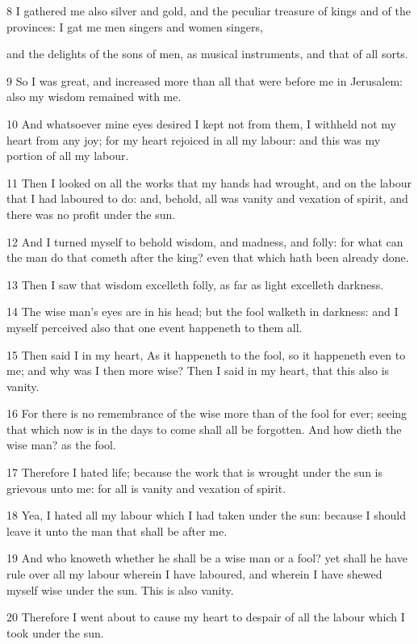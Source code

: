 \documentclass[12pt]{report}
\begin{document}
8 I gathered me also silver and gold, and the peculiar treasure
   of
   kings and of the provinces: I gat me men singers and women singers,
   
   and the delights of the sons of men, as musical instruments, and
   that
   of all sorts. 
   
9 So I was great, and increased more than all that were before me
   in
   Jerusalem: also my wisdom remained with me.
   
10 And whatsoever mine eyes desired I kept not from them, I
   withheld
   not my heart from any joy; for my heart rejoiced in all my labour:
   and
   this was my portion of all my labour.
   
11 Then I looked on all the works that my hands had wrought, and
   on
   the labour that I had laboured to do: and, behold, all was vanity
   and
   vexation of spirit, and there was no profit under the sun.
   
12 And I turned myself to behold wisdom, and madness, and folly:
   for
   what can the man do that cometh after the king? even that which
   hath
   been already done.
   
13 Then I saw that wisdom excelleth folly, as far as light
   excelleth
   darkness. 
   
14 The wise man's eyes are in his head; but the fool walketh in
   darkness: and I myself perceived also that one event happeneth to
   them
   all.
   
15 Then said I in my heart, As it happeneth to the fool, so it
   happeneth even to me; and why was I then more wise? Then I said in
   my
   heart, that this also is vanity.
   
16 For there is no remembrance of the wise more than of the fool
   for
   ever; seeing that which now is in the days to come shall all be
   forgotten. And how dieth the wise man? as the fool.
   
17 Therefore I hated life; because the work that is wrought under
   the sun is grievous unto me: for all is vanity and vexation of
   spirit.
   
18 Yea, I hated all my labour which I had taken under the sun:
   because I should leave it unto the man that shall be after me.
   
19 And who knoweth whether he shall be a wise man or a fool? yet
   shall he have rule over all my labour wherein I have laboured, and 
   wherein I have shewed myself wise under the sun. This is also
   vanity.
   
20 Therefore I went about to cause my heart to despair of all the
   labour which I took under the sun.
   
\end{document}
